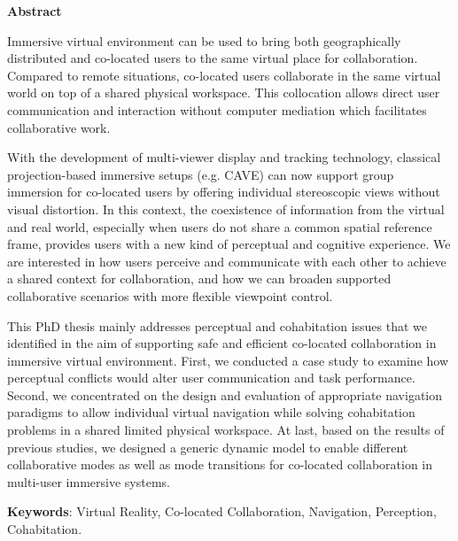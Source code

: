 \centerline{\LARGE \textbf{Abstract}}

\vspace*{\baselineskip}
Immersive virtual environment can be used to bring both geographically distributed and co-located users to the same virtual place for collaboration. Compared to remote situations, co-located users collaborate in the same virtual world on top of a shared physical workspace. This collocation allows direct user communication and interaction without computer mediation which facilitates collaborative work.

With the development of multi-viewer display and tracking technology, classical projection-based immersive setups (e.g. CAVE) can now support group immersion for co-located users by offering individual stereoscopic views without visual distortion. In this context, the coexistence of information from the virtual and real world, especially when users do not share a common spatial reference frame, provides users with a new kind of perceptual and cognitive experience. We are interested in how users perceive and communicate with each other to achieve a shared context for collaboration, and how we can broaden supported collaborative scenarios with more flexible viewpoint control.

This PhD thesis mainly addresses perceptual and cohabitation issues that we identified in the aim of supporting safe and efficient co-located collaboration in immersive virtual environment. First, we conducted a case study to examine how perceptual conflicts would alter user communication and task performance. Second, we concentrated on the design and evaluation of appropriate navigation paradigms to allow individual virtual navigation while solving cohabitation problems in a shared limited physical workspace. At last, based on the results of previous studies, we designed a generic dynamic model to enable different collaborative modes as well as mode transitions for co-located collaboration in multi-user immersive systems.


\textbf{Keywords}: Virtual Reality, Co-located Collaboration, Navigation, Perception, Cohabitation.

\pagebreak
